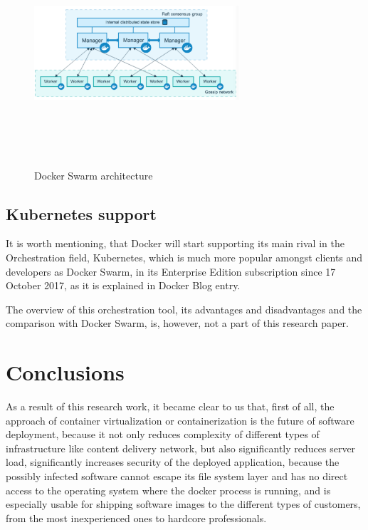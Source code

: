 \begin{figure}
\includegraphics[height=3in, width=3in]{DockerSwarm}
\caption{Docker Swarm architecture}
\cite{DockerSwarmPic}
\label{fig:DockerSwarmPic}
\end{figure}

\subsection{Kubernetes support}

It is worth mentioning,
that Docker will start
supporting its main rival in the Orchestration field, Kubernetes,
which is much more popular amongst clients and developers as Docker Swarm,
in its Enterprise Edition subscription since 17 October 2017,
as it is explained in Docker Blog entry.\cite{DockerKubernetesSupport}

The overview of this orchestration tool, its advantages and disadvantages
and the comparison with Docker Swarm, is, however, not a part of
this research paper.

\section{Conclusions}

As a result of this research work, it became clear to us that, first of all,
the approach of container virtualization or containerization
is the future of software deployment, because it not only reduces complexity of
different types of infrastructure like content delivery network,
but also significantly reduces server load, significantly
increases security of the deployed application,
because the possibly infected software cannot
escape its file system layer and has no direct access
to the operating system where the docker process is running, and is
especially usable for shipping software
images to the different types of customers,
from the most inexperienced ones to hardcore professionals.

